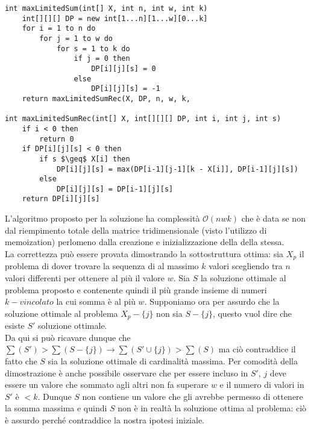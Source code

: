 \documentclass[../cheatSheetAlgoritmi.tex]{subfiles}
\begin{document}
\begin{lstlisting}[caption=Somma Massimale (k w)-vincolata]
int maxLimitedSum(int[] X, int n, int w, int k)
	int[][][] DP = new int[1...n][1...w][0...k]
	for i = 1 to n do
		for j = 1 to w do
			for s = 1 to k do
				if j = 0 then 
					DP[i][j][s] = 0
				else 
					DP[i][j][s] = -1
	return maxLimitedSumRec(X, DP, n, w, k, 

int maxLimitedSumRec(int[] X, int[][][] DP, int i, int j, int s)
	if i < 0 then
		return 0
	if DP[i][j][s] < 0 then
		if s $\geq$ X[i] then
			DP[i][j][s] = max(DP[i-1][j-1][k - X[i]], DP[i-1][j][s])
		else
			DP[i][j][s] = DP[i-1][j][s]
	return DP[i][j][s]
\end{lstlisting}
L'algoritmo proposto per la soluzione ha complessità $\mathcal{O}(nwk)$ che è data se non dal riempimento totale della matrice tridimensionale (visto l'utilizzo di memoization) perlomeno dalla creazione e inizializzazione della della stessa.\\
La correttezza può essere provata dimostrando la sottostruttura ottima: sia $X_{p}$ il problema di dover trovare la sequenza di al massimo $k$ valori scegliendo tra $n$ valori differenti per ottenere al più il valore $w$. Sia $S$ la soluzione ottimale al problema proposto e contenente quindi il più grande insieme di numeri $k-vincolato$ la cui somma è al più $w$. Supponiamo ora per assurdo che la soluzione ottimale al problema $X_{p} - \{j\}$ non sia $S - \{j\}$, questo vuol dire che esiste $S'$ soluzione ottimale.\\
Da qui si può ricavare dunque che $\sum(S') > \sum(S - \{j\}) \rightarrow \sum(S' \cup \{j\}) > \sum(S)$ ma ciò contraddice il fatto che $S$ sia la soluzione ottimale di cardinalità massima. Per comodità della dimostrazione è anche possibile osservare che per essere incluso in $S'$, $j$ deve essere un valore che sommato agli altri non fa superare $w$ e il numero di valori in $S'$ è $< k$. Dunque $S$ non contiene un valore che gli avrebbe permesso di ottenere la somma massima e quindi $S$ non è in realtà la soluzione ottima al problema: ciò è assurdo perché contraddice la nostra ipotesi iniziale.
\newpage
\end{document}
